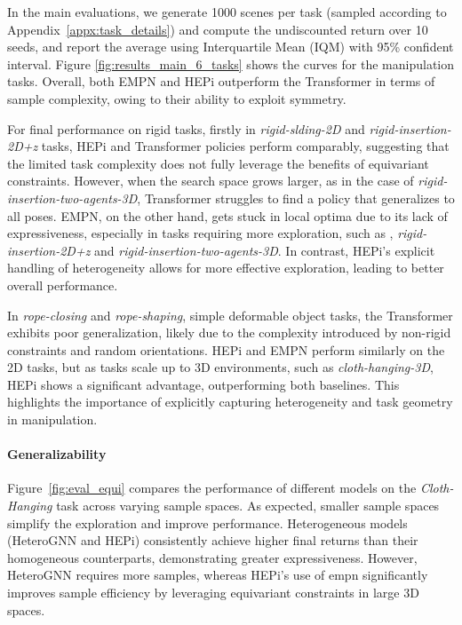 

In the main evaluations, we generate 1000 scenes per task (sampled according to Appendix~\ref{appx:task_details}) and compute the undiscounted return over 10 seeds, and report the average using Interquartile Mean (IQM) \citep{agarwal2021iqm} with 95\% confident interval. Figure \ref{fig:results_main_6_tasks} shows the  curves for the  manipulation tasks. Overall, both EMPN and HEPi outperform the Transformer in terms of sample complexity, owing to their ability to exploit symmetry.

For final performance on rigid tasks, firstly in \textit{rigid-slding-2D} and \textit{rigid-insertion-2D+z} tasks, HEPi and Transformer policies perform comparably, suggesting that the limited task complexity does not fully leverage the benefits of equivariant constraints. However, when the search space grows larger, as in the case of \textit{rigid-insertion-two-agents-3D}, Transformer struggles to find a policy that generalizes to all poses. EMPN, on the other hand, gets stuck in local optima due to its lack of expressiveness, especially in tasks requiring more exploration, such as , \textit{rigid-insertion-2D+z} and \textit{rigid-insertion-two-agents-3D}. In contrast, HEPi’s explicit handling of heterogeneity allows for more effective exploration, leading to better overall performance.

In \textit{rope-closing} and \textit{rope-shaping}, simple deformable object tasks, the Transformer exhibits poor generalization, likely due to the complexity introduced by non-rigid constraints and random orientations. HEPi and EMPN perform similarly on the 2D tasks, but as tasks scale up to 3D environments, such as \textit{cloth-hanging-3D}, HEPi shows a significant advantage, outperforming both baselines. This highlights the importance of explicitly capturing heterogeneity and task geometry in manipulation. %




\paragraph{Generalizability}



Figure~\ref{fig:eval_equi} compares the performance of different models on the \emph{Cloth-Hanging} task across varying sample spaces. As expected, smaller sample spaces simplify the exploration and improve performance. Heterogeneous models (HeteroGNN and HEPi) consistently achieve higher final returns than their homogeneous counterparts, demonstrating greater expressiveness. However, HeteroGNN requires more samples, whereas HEPi's use of \gls{empn} significantly improves sample efficiency by leveraging equivariant constraints in large 3D spaces.

